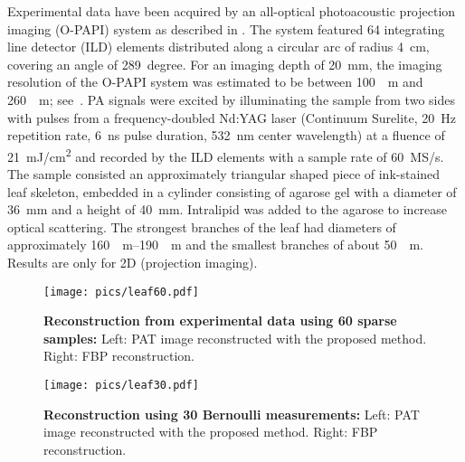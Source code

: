 \documentclass[11pt]{article}
\begin{document}
Experimental data have been acquired by an all-optical photoacoustic projection imaging (O-PAPI) system as described in \cite{Bauer-Marschallinger:17}. The system featured 64 integrating line detector (ILD) elements distributed along a circular arc of radius \SI{4}{cm}, covering an angle of \SI{289}{degree}. For an imaging depth of \SI{20}{mm}, the imaging resolution of the O-PAPI system was estimated to be between
\SI{100}{\mu m} and \SI{260}{\mu m}; see~\cite{Bauer-Marschallinger:17}. PA signals were excited by illuminating the sample from two sides with pulses from a frequency-doubled Nd:YAG laser (Continuum Surelite, \SI{20}{Hz} repetition rate, \SI{6}{ns} pulse duration, \SI{532}{nm} center wavelength) at a fluence of \SI{21}{mJ/cm^2} and recorded by the ILD elements with a sample rate of
\SI{60}{MS/s}.
The sample consisted an approximately triangular shaped piece of ink-stained leaf skeleton, embedded in a cylinder consisting of agarose gel with a diameter of \SI{36}{mm} and a height of \SI{40}{mm}. Intralipid was added to the agarose to increase optical scattering. The strongest branches of the leaf had diameters of approximately \SIrange{160}{190}{\mu m} and the smallest branches of about \SI{50}{\mu m}. Results are only for 2D (projection imaging).



\begin{psfrags}
	\begin{figure}[htb!]
		\begin{center}
			\texttt{[image: pics/leaf60.pdf]}
			\caption{\textbf{Reconstruction from experimental data using
					60 sparse samples:}\label{fig:leaf60}
				Left: PAT image reconstructed with the proposed method.
				Right: FBP reconstruction.}
		\end{center}
	\end{figure}
\end{psfrags}


\begin{psfrags}
	\begin{figure}[htb!]
		\begin{center}
			\texttt{[image: pics/leaf30.pdf]}
			\caption{\textbf{Reconstruction using  30 Bernoulli measurements:}\label{fig:leaf30}
				Left: PAT image reconstructed with the proposed method.
				Right: FBP reconstruction.}
		\end{center}
	\end{figure}
\end{psfrags}
\end{document}

